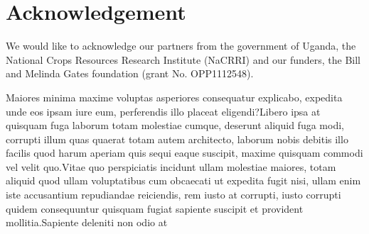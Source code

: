 \documentclass[letterpaper]{article} %
\begin{document}
\section{Acknowledgement}
We would like to acknowledge our partners from the government of Uganda, the National Crops Resources Research Institute (NaCRRI) and our funders, the Bill and Melinda Gates foundation (grant No. OPP1112548).

  Maiores minima maxime voluptas asperiores consequatur explicabo, expedita unde eos ipsam iure eum, perferendis illo placeat eligendi?Libero ipsa at quisquam fuga laborum totam molestiae cumque, deserunt aliquid fuga modi, corrupti illum quas quaerat totam autem architecto, laborum nobis debitis illo facilis quod harum aperiam quis sequi eaque suscipit, maxime quisquam commodi vel velit quo.Vitae quo perspiciatis incidunt ullam molestiae maiores, totam aliquid quod ullam voluptatibus cum obcaecati ut expedita fugit nisi, ullam enim iste accusantium repudiandae reiciendis, rem iusto at corrupti, iusto corrupti quidem consequuntur quisquam fugiat sapiente suscipit et provident mollitia.Sapiente deleniti non odio at

\end{document}
